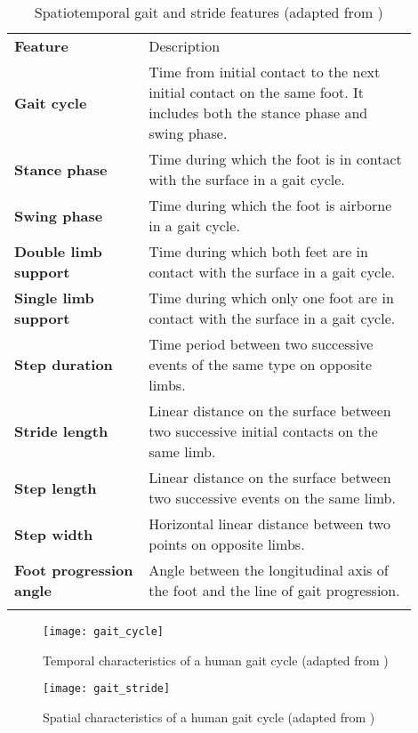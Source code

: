 	{\footnotesize\renewcommand*{\arraystretch}{1.4}
		\begin{longtable}{@{}>{\raggedright\arraybackslash\bfseries}m{0.3\linewidth}>{\raggedright\arraybackslash}m{0.6\linewidth}@{}}
		\toprule
		Feature & Description \\* \midrule
		\endhead
		Gait cycle & Time from initial contact to the next initial contact on the same foot. It includes both the stance phase and swing phase.  \\
		Stance phase & Time during which the foot is in contact with the surface in a gait cycle. \\
		Swing phase & Time during which the foot is airborne in a gait cycle. \\
		Double limb support & Time during which both feet are in contact with the surface in a gait cycle. \\
		Single limb support & Time during which only one foot are in contact with the surface in a gait cycle. \\
		Step duration & Time period between two successive events of the same type on opposite limbs. \\
		Stride length & Linear distance on the surface between two successive initial contacts on the same limb. \\
		Step length & Linear distance on the surface between two successive events on the same limb. \\
		Step width & Horizontal linear distance between two points on opposite limbs. \\
		Foot progression angle & Angle between the longitudinal axis of the foot and the line of gait progression. \\* \bottomrule
		\caption[Spatiotemporal gait and stride features]{Spatiotemporal gait and stride features (adapted from \cite{Biase2020})}
		\label{tab:gait_feat}
	\end{longtable}}

	\begin{figure}[ht]
		\centering
		\texttt{[image: gait\_cycle]}
		\caption[Temporal characteristics of a human gait cycle]{Temporal characteristics of a human gait cycle (adapted from \cite{Zanardi2021})}
		\label{fig:gait_drawing}
	\end{figure}

    \begin{figure}[ht]
    	\centering
    	\texttt{[image: gait\_stride]}
    	\caption[Spatial characteristics of a human gait cycle]{Spatial characteristics of a human gait cycle (adapted from \cite{Biase2020})}
    	\label{fig:gait_stride}
    \end{figure}

